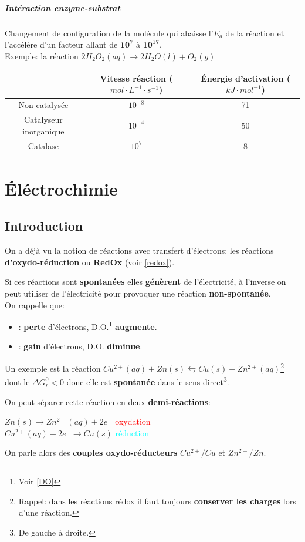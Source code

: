 \documentclass[10pt,a4paper]{book}
\begin{document}
\paragraph{Intéraction enzyme-substrat} Changement de configuration de la molécule qui abaisse l'$E_a$ de la réaction et l'accélère d'un facteur allant de $\mathbf{10^7}$ à $\mathbf{10^{17}}$. \\
Exemple: la réaction \(2H_2O_2(aq) \rightarrow 2H_2O(l) + O_2(g)\)
\begin{center}
\begin{tabular}{| c | c | c |}
\hline
 & Vitesse réaction ($mol\cdot L^{-1}\cdot s^{-1}$) & Énergie d'activation ($kJ\cdot mol^{-1}$) \\
\hline
Non catalysée & $10^{-8}$ & 71 \\
\hline
Catalyseur inorganique & $10^{-4}$ & 50 \\
\hline
Catalase\footnotemark & $10^{7}$ & 8 \\
\hline
\end{tabular}
\end{center}

\chapter{Éléctrochimie}

\section{Introduction}

On a déjà vu la notion de réactions avec transfert d'électrons: les réactions \textbf{d'oxydo-réduction} ou \textbf{RedOx} (voir \ref{redox}). \par
Si ces réactions sont \textbf{spontanées} elles \textbf{génèrent} de l'électricité, à l'inverse on peut utiliser de l'électricité pour provoquer une réaction \textbf{non-spontanée}. \\
On rappelle que:
\begin{itemize}
\item \textbf{\color{red}{Oxydation}}: \textbf{perte} d'électrons, D.O.\footnote{Voir \ref{DO}} \textbf{augmente}.
\item \textbf{\color{cyan}{Réduction}}: \textbf{gain} d'électrons, D.O. \textbf{diminue}.
\end{itemize}
Un exemple est la réaction \(Cu^{2+}(aq) + Zn(s) \leftrightarrows Cu(s) + Zn^{2+}(aq)\)\footnote{Rappel: dans les réactions rédox il faut toujours \textbf{conserver les charges} lors d'une réaction.} dont le $\Delta G^0_r < 0$ donc elle est \textbf{spontanée} dans le sens direct\footnote{De gauche à droite.}. \par
On peut séparer cette réaction en deux \textbf{demi-réactions}:
\begin{center}
\(Zn(s) \rightarrow Zn^{2+}(aq) + 2e^-\) \textcolor{red}{oxydation} \\
\(Cu^{2+}(aq) + 2e^- \rightarrow Cu(s)\) \textcolor{cyan}{réduction}
\end{center}
On parle alors des \textbf{couples oxydo-réducteurs} $Cu^{2+}/Cu$ et $Zn^{2+}/Zn$.
\end{document}
